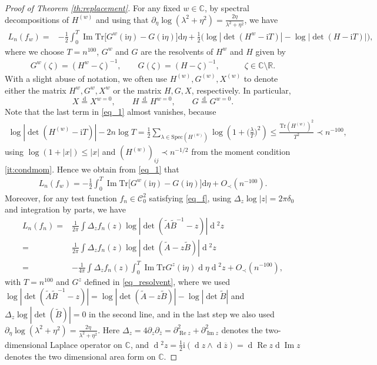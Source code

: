 \documentclass[10pt,reqno]{amsart}
\numberwithin{equation}{section}
\numberwithin{figure}{section}
\theoremstyle{plain}
\newcommand{\C}{{\mathbb{C}}}
\newcommand{\A}{{\tilde{A}}}
\newcommand{\B}{{\tilde{B}}}
\newcommand{\ii}{\mathrm{i}}
\newcommand{\wt}{\widetilde}
\newcommand{\<}{\langle}
\renewcommand{\>}{\rangle}
\newcommand{\dd}{\operatorname{d}\!{}}
\renewcommand{\Re}{\operatorname{Re}}
\renewcommand{\Im}{\operatorname{Im}}
\begin{document}
\begin{proof}[Proof of Theorem \ref{th:replacement}]
For any fixed $w \in \C$, by spectral decompositions of $H^{(w)}$ and using that $\partial_\eta \log(\lambda^2+\eta^2)=\frac{2\eta}{\lambda^2+\eta^2}$, we have
\begin{align}\label{eq_1}
     L_n(f_{w})=& -\frac{1}{2}\int_{0}^{T} \Im \mathrm{Tr} \big[G^w(\ii \eta)-G(\ii \eta)\big] \mathrm{d} \eta+\frac{1}{2} \Big(\log |\det (H^w-\ii T)|-\log |\det (H-\ii T)|\Big),
\end{align}
where we choose $T=n^{100}$, $G^{w}$ and $G$ are the resolvents of $H^{w}$ and $H$ given by
\begin{align}\label{eq_resolvent}
G^{w}(\zeta)=(H^{w}-\zeta)^{-1},  \qquad G(\zeta)=(H-\zeta)^{-1}, \qquad \quad \zeta \in \mathbb{C} \setminus \mathbb{R}.
\end{align}
With a slight abuse of notation, we often use $H^{(w)}, G^{(w)}, X^{(w)}$ to denote either the matrix $H^{w}, G^{w}, X^{w}$ or the matrix $H, G, X$, respectively.
In particular, 
$$X\overset{\mathrm{d}}{=}X^{w=0}, \qquad H\overset{\mathrm{d}}{=}H^{w=0}, \qquad G\overset{\mathrm{d}}{=}G^{w=0}.$$ 
Note that the last term in \eqref{eq_1} almost vanishes, because 
	\begin{align}
		\log |\det (H^{(w)}-\ii T)|-2n \log T
        = \frac{1}{2}\sum_{\lambda \in \mathrm{Spec}(H^{(w)})} \log \left( 1+\Big(\frac{\lambda}{T}\Big)^2\right) \leq \frac{\mathrm{Tr} (H^{(w)})^2}{T^2} \prec n^{-100},
	\end{align}
using $\log(1+|x|)\leq |x|$ and $(H^{(w)})_{ij} \prec n^{-1/2}$ from the moment condition \ref{it:condmom}. Hence we obtain from \eqref{eq_1} that
\begin{align}\label{eq_det}
    L_n(f_{w}) = -\frac{1}{2}\int_{0}^{T} \Im \mathrm{Tr} \big[ G^w(\ii \eta)-G(\ii \eta)\big] \mathrm{d} \eta+O_\prec(n^{-100}). 
\end{align}
 Moreover, for any test function $f_n \in \mathcal{C}_0^2$ satisfying \eqref{eq_f}, using $\Delta_z \log |z|=2\pi\delta_0$ and integration by parts, we have 
\begin{align}
    L_n(f_{n})=&\frac{1}{2\pi}\int \Delta_z f_n(z) \log |\det (\A\B^{-1}-z)| \dd^2 z\\
    =&\frac{1}{2\pi}\int \Delta_z f_n(z) \log |\det (\A-z\B)|\dd^2 z\\
    =&-\frac{1}{4\pi} \int \Delta_z f_n(z) \int_{0}^{T} \Im \mathrm{Tr} G^z(\ii \eta) \dd \eta \dd^2 z+O_\prec(n^{-100}),\label{eq_int_f}
\end{align}
with $T=n^{100}$ and $G^z$ defined in \eqref{eq_resolvent}, where we used $\log |\det (\A\B^{-1}-z)|=\log |\det (\A-z\B)|-\log |\det \B|$ and  $\Delta_z \log |\det(\wt B)|=0$ in the second line, and in the last step we also used $\partial_\eta \log(\lambda^2+\eta^2)=\frac{2\eta}{\lambda^2+\eta^2}$.
Here $\Delta_z=4\partial_z \partial_{\bar z}=\partial^2_{\Re z}+\partial^2_{\Im z}$ denotes the two-dimensional Laplace operator on $\C$, and $\dd^2 z= \frac{1}{2}\ii(\dd z\wedge \dd \overline{z})=\dd \Re z \dd \Im z$ denotes the two dimensional area form on $\C$.


\end{proof}
\end{document}
